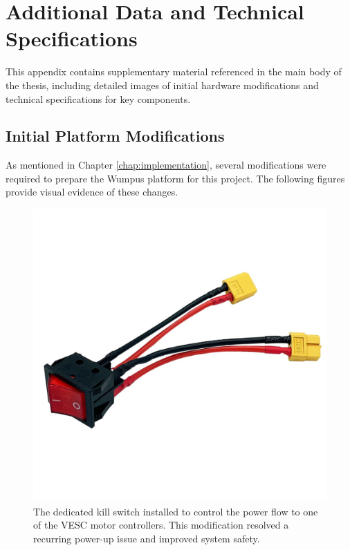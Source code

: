 \chapter{Additional Data and Technical Specifications}
\label{chap:appendix_a}

This appendix contains supplementary material referenced in the main body of the thesis, including detailed images of initial hardware modifications and technical specifications for key components.

\section{Initial Platform Modifications}
\label{sec:appendix_platform_mods}
As mentioned in Chapter \ref{chap:implementation}, several modifications were required to prepare the Wumpus platform for this project. The following figures provide visual evidence of these changes.

\begin{figure}[h!]
    \centering
    \includegraphics[width=0.6\linewidth]{figures/killswitch.PNG}
    \caption{The dedicated kill switch installed to control the power flow to one of the VESC motor controllers. This modification resolved a recurring power-up issue and improved system safety.}
    \label{fig:appendix_killswitch}
\end{figure}

